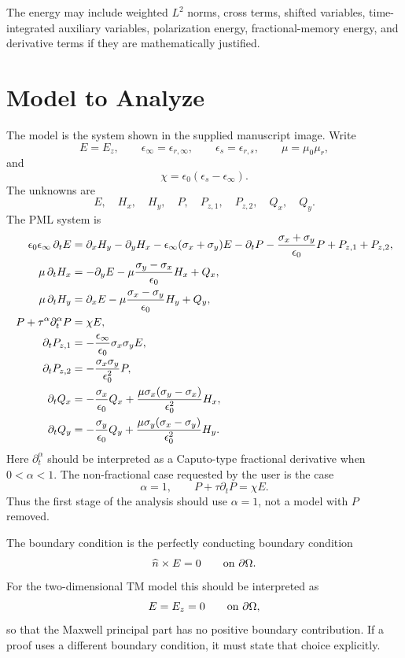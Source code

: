 \documentclass[UTF8,a4paper,12pt]{ctexart}
\begin{document}
The energy may include weighted \(L^2\) norms, cross terms, shifted variables, time-integrated auxiliary variables, polarization energy, fractional-memory energy, and derivative terms if they are mathematically justified.

\section{Model to Analyze}
\label{sec:model}

The model is the system shown in the supplied manuscript image.  Write
\[
  E=E_z,\qquad \epsilon_\infty=\epsilon_{r,\infty},\qquad
  \epsilon_s=\epsilon_{r,s},\qquad \mu=\mu_0\mu_r,
\]
and
\[
  \chi=\epsilon_0(\epsilon_s-\epsilon_\infty).
\]
The unknowns are
\[
  E,\quad H_x,\quad H_y,\quad P,\quad P_{z,1},\quad P_{z,2},\quad Q_x,\quad Q_y.
\]
The PML system is
\begin{equation}
\begin{aligned}
\epsilon_0\epsilon_\infty\,\partial_t E
&= \partial_xH_y-\partial_yH_x
   -\epsilon_\infty(\sigma_x+\sigma_y)E
   -\partial_tP-\frac{\sigma_x+\sigma_y}{\epsilon_0}P
   +P_{z,1}+P_{z,2},\\
\mu\,\partial_tH_x
&= -\partial_yE-\mu\frac{\sigma_y-\sigma_x}{\epsilon_0}H_x+Q_x,\\
\mu\,\partial_tH_y
&= \partial_xE-\mu\frac{\sigma_x-\sigma_y}{\epsilon_0}H_y+Q_y,\\
P+\tau^\alpha\partial_t^\alpha P
&=\chi E,\\
\partial_tP_{z,1}
&=-\frac{\epsilon_\infty}{\epsilon_0}\sigma_x\sigma_y E,\\
\partial_tP_{z,2}
&=-\frac{\sigma_x\sigma_y}{\epsilon_0^2}P,\\
\partial_tQ_x
&=-\frac{\sigma_x}{\epsilon_0}Q_x
  +\frac{\mu\sigma_x(\sigma_y-\sigma_x)}{\epsilon_0^2}H_x,\\
\partial_tQ_y
&=-\frac{\sigma_y}{\epsilon_0}Q_y
  +\frac{\mu\sigma_y(\sigma_x-\sigma_y)}{\epsilon_0^2}H_y.
\end{aligned}
\label{eq:main-model}
\end{equation}
Here \(\partial_t^\alpha\) should be interpreted as a Caputo-type fractional derivative when \(0<\alpha<1\).  The non-fractional case requested by the user is the case
\[
  \alpha=1,\qquad
  P+\tau\partial_tP=\chi E.
\]
Thus the first stage of the analysis should use \(\alpha=1\), not a model with \(P\) removed.

The boundary condition is the perfectly conducting boundary condition
\[
  \widehat n\times E=0\qquad\text{on }\partial\Omega.
\]
For the two-dimensional TM model this should be interpreted as
\[
  E=E_z=0\qquad\text{on }\partial\Omega,
\]
so that the Maxwell principal part has no positive boundary contribution.  If a proof uses a different boundary condition, it must state that choice explicitly.
\end{document}
